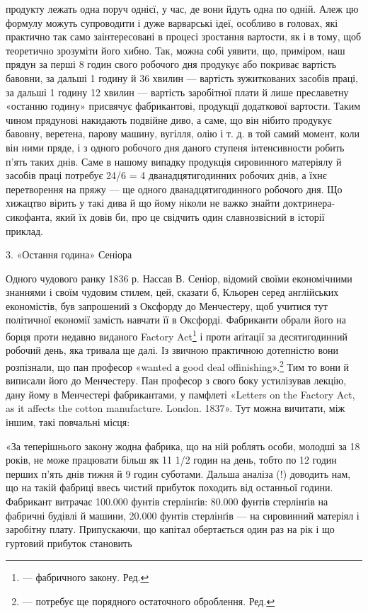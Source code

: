 продукту лежать одна поруч однієї, у час, де вони йдуть одна по одній. Алеж цю формулу можуть
супроводити і дуже варварські ідеї, особливо в головах, які практично так само заінтересовані
в процесі зростання вартости, як і в тому, щоб теоретично зрозуміти його хибно. Так, можна собі
уявити, що, приміром, наш прядун за перші 8 годин свого робочого дня продукує або покриває вартість
бавовни, за дальші 1 годину й 36 хвилин — вартість зужиткованих засобів праці, за дальші 1 годину 12
хвилин — вартість заробітної плати й лише преславетну «останню
годину» присвячує фабрикантові, продукції додаткової вартости. Таким чином прядунові накидають
подвійне диво, а саме, що він нібито продукує бавовну, веретена, парову машину, вугілля,
олію і т. д. в той самий момент, коли він ними пряде, і з одного робочого дня даного ступеня
інтенсивности робить п’ять
таких днів. Саме в нашому випадку продукція сировинного матеріялу й засобів праці потребує 24/6 = 4
дванадцятигодинних робочих днів, а їхнє перетворення на пряжу — ще одного дванадцятигодинного
робочого дня. Що хижацтво вірить у такі дива й що йому ніколи не важко знайти доктринера-сикофанта,
який їх довів би, про це свідчить один славнозвісний в історії приклад.

3. «Остання година» Сеніора

Одного чудового ранку 1836 р. Нассав В. Сеніор, відомий своїми економічними знаннями і своїм чудовим
стилем, цей, сказати б, Кльорен серед англійських економістів, був запрошений
з Оксфорду до Менчестеру, щоб учитися тут політичної економії замість навчати її в Оксфорді.
Фабриканти обрали його на борця проти недавно виданого Factory Act\footnote*{
— фабричного закону. Ред.
} і проти аґітації за
десятигодинний
робочий день, яка тривала ще далі. Із звичною практичною дотепністю вони розпізнали, що пан професор
«wanted а
good deal offinishing».\footnote*{
— потребує ще порядного остаточного оброблення. Ред.
} Тим то вони й виписали його до Менчестеру. Пан професор з свого боку
устилізував лекцію, дану йому в Менчестері фабрикантами, у памфлеті «Letters on the Factory Act, as
it affects the cotton manufacture. London. 1837». Тут можна вичитати, між іншим, такі повчальні
місця:

«За теперішнього закону жодна фабрика, що на ній роблять особи, молодші за 18 років, не може
працювати більш як 11 1/2 годин на день, тобто по 12 годин перших п’ять днів тижня й 9 годин
суботами. Дальша аналіза (!) доводить нам, що на такій фабриці ввесь чистий прибуток походить від
останньої години. Фабрикант
витрачає 100.000 фунтів стерлінґів: 80.000 фунтів стерлінґів на фабричні будівлі й машини, 20.000
фунтів стерлінґів — на сировинний матеріял і заробітну плату. Припускаючи, що капітал обертається
один раз на рік і що гуртовий прибуток становить